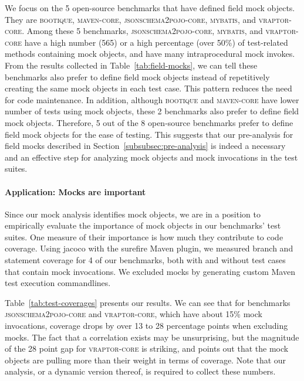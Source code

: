 We focus on the 5 open-source benchmarks that have defined field mock objects. They are \textsc{bootique}, \textsc{maven-core}, \textsc{jsonschema2pojo-core}, \textsc{mybatis}, and \textsc{vraptor-core}. Among these 5 benchmarks, \textsc{jsonschema2pojo-core}, \textsc{mybatis}, and \textsc{vraptor-core} have a high number (565) or a high percentage (over 50\%) of test-related methods containing mock objects, and have many intraprocedural mock invokes. From the results collected in Table~\ref{tab:field-mocks}, we can tell these benchmarks also prefer to define field mock objects instead of repetitively creating the same mock objects in each test case. This pattern reduces the need for code maintenance. In addition, although \textsc{bootique} and \textsc{maven-core} have lower number of tests using mock objects, these 2 benchmarks also prefer to define field mock objects. Therefore, 5 out of the 8 open-source benchmarks prefer to define field mock objects for the ease of testing. This suggests that our pre-analysis for field mocks described in Section~\ref{subsubsec:pre-analysis} is indeed a necessary and an effective step for analyzing mock objects and mock invocations in the test suites.

\paragraph{Application: Mocks are important} Since our mock analysis identifies mock objects, we are in a position to empirically evaluate the importance of mock objects in our benchmarks' test suites. One measure of their importance is how much they contribute to code coverage. Using jacoco with the surefire Maven plugin, we measured branch and statement coverage for 4 of our benchmarks, both with and without test cases that contain mock invocations. We excluded mocks by generating custom Maven test execution commandlines. 

Table~\ref{tab:test-coverages} presents our results. We can see that for benchmarks \textsc{jsonschema2pojo-core} and \textsc{vraptor-core}, which have about 15\% mock invocations, coverage drops by over 13 to 28 percentage points when excluding mocks. The fact that a correlation exists may be unsurprising, but the magnitude of the 28 point gap for \textsc{vraptor-core} is striking, and points out that the mock objects are pulling more than their weight in terms of coverage. Note that our analysis, or a dynamic version thereof, is required to collect these numbers. 


